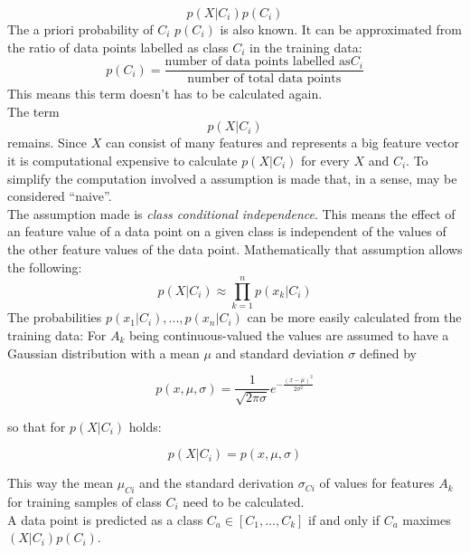 \begin{equation} \label{eq:nb3}
p(X|C_i) p(C_i)
\end{equation}
The a priori probability of $C_i$  $p(C_i)$ is also known. It can be approximated from the ratio of data points labelled as class $C_i$ in the training data:
\begin{equation} \label{eq:nb4}
p(C_i)=\frac{\text{number of data points labelled as}C_i}{\text{number of total data points}}
\end{equation}
This means this term doesn't has to be calculated again.
\\
The term
\begin{equation} \label{eq:nb5}
p(X|C_i)
\end{equation}
remains. Since $X$ can consist of many features and represents a big feature vector it is computational expensive to calculate $p(X|C_i)$ for every $X$ and $C_i$. To simplify the computation involved a assumption is made that, in a sense, may be considered ``naive''.
\\
The assumption made is \emph{class conditional independence}. This means the effect of an feature value of a data point on a given class is independent of the values of the other feature values of the data point. Mathematically that assumption allows the following:
\begin{equation} \label{eq:nb6}
p(X|C_i) \approx \prod_{k=1}^{n} p(x_k|C_i)
\end{equation}
The probabilities $p(x_1|C_i), ... ,p(x_n|C_i)$ can be more easily calculated from the training data:
For $A_k$ being continuous-valued the values are assumed to have a Gaussian distribution with a mean $\mu$ and standard deviation $\sigma$ defined by

\begin{equation} \label{eq:nb7}
p(x,\mu ,\sigma) = \frac{1}{\sqrt{2\pi \sigma}}e^{-\frac{(x-\mu )^2}{2\sigma ^2}}
\end{equation}

so that for $p(X|C_i)$ holds:

\begin{equation} \label{eq:nb8}
p(X|C_i) = p(x,\mu ,\sigma)
\end{equation}

This way the mean $\mu_{Ci}$ and the standard derivation $\sigma_{Ci}$ of values for features $A_k$ for training samples of class $C_i$ need to be calculated.
\\

A data point is predicted as a class $C_a \in [C_1,...,C_k]$ if and only if $C_a$ maximes $(X|C_i) p(C_i)$. \cite{friedman2000additive} \cite{russell1995modern} \cite{rish2001empirical}
